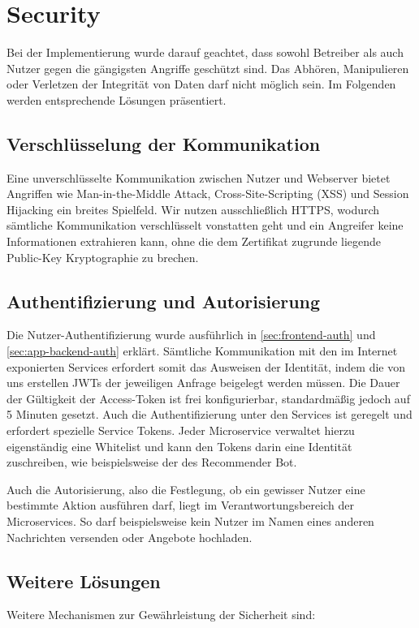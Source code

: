 \documentclass{article}
\begin{document}
\section{Security} %
Bei der Implementierung wurde darauf geachtet, dass sowohl Betreiber als auch Nutzer gegen die gängigsten Angriffe geschützt sind. Das Abhören, Manipulieren oder Verletzen der Integrität von Daten darf nicht möglich sein. Im Folgenden werden entsprechende Lösungen präsentiert.


\subsection{Verschlüsselung der Kommunikation}
Eine unverschlüsselte Kommunikation zwischen Nutzer und Webserver bietet Angriffen wie Man-in-the-Middle Attack, Cross-Site-Scripting (XSS) und Session Hijacking ein breites Spielfeld. Wir nutzen ausschließlich HTTPS, wodurch sämtliche Kommunikation verschlüsselt vonstatten geht und ein Angreifer keine Informationen extrahieren kann, ohne die dem Zertifikat zugrunde liegende Public-Key Kryptographie zu brechen.


\subsection{Authentifizierung und Autorisierung}
\label{sec:authentication}

Die Nutzer-Authentifizierung wurde ausführlich in \autoref{sec:frontend-auth} und \autoref{sec:app-backend-auth} erklärt. Sämtliche Kommunikation mit den im Internet exponierten Services erfordert somit das Ausweisen der Identität, indem die von uns erstellen JWTs der jeweiligen Anfrage beigelegt werden müssen. Die Dauer der Gültigkeit der Access-Token ist frei konfigurierbar, standardmäßig jedoch auf 5 Minuten gesetzt. Auch die Authentifizierung unter den Services ist geregelt und erfordert spezielle Service Tokens. Jeder Microservice verwaltet hierzu eigenständig eine Whitelist und kann den Tokens darin eine Identität zuschreiben, wie beispielsweise der des Recommender Bot. 

Auch die Autorisierung, also die Festlegung, ob ein gewisser Nutzer eine bestimmte Aktion ausführen darf, liegt im Verantwortungsbereich der Microservices. So darf beispielsweise kein Nutzer im Namen eines anderen Nachrichten versenden oder Angebote hochladen.


\subsection{Weitere Lösungen}
Weitere Mechanismen zur Gewährleistung der Sicherheit sind:
\end{document}
